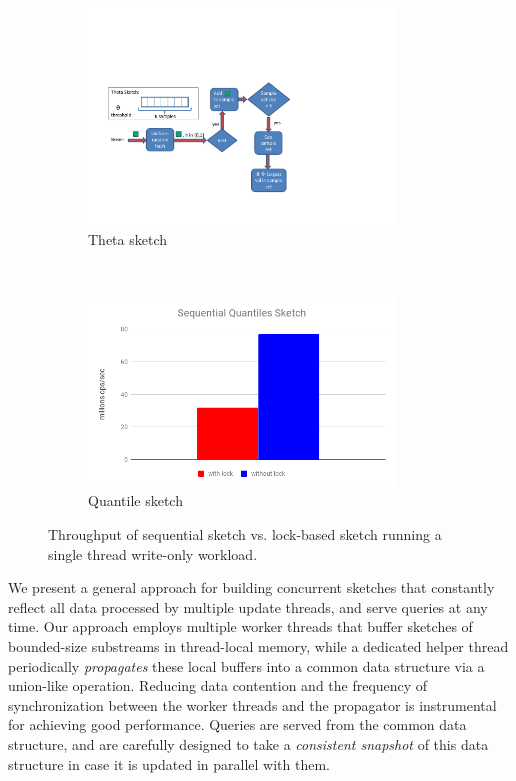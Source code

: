 \begin{figure}[t!]
    \centering
    \begin{subfigure}[t]{0.49\textwidth}
        \centering
        \includegraphics[width=3.2in]{images/seqTheta}
        \caption{Theta sketch}
        \label{fig:LockIsBadTheta}
    \end{subfigure}%
    ~ 
    \begin{subfigure}[t]{0.49\textwidth}
        \centering
        \includegraphics[width=3.2in]{images/seqQuantiles}
        \caption{Quantile sketch}
        \label{fig:LockIsBadQuantiles}
    \end{subfigure}
    \caption{Throughput of sequential sketch vs. lock-based sketch running a single thread write-only workload.}
    \label{fig:lockBased}
\end{figure}



We present a general approach for building concurrent sketches that
constantly reflect all data processed by multiple update threads, 
and serve queries at any time. %
Our  approach employs multiple worker threads that buffer sketches of bounded-size substreams in thread-local memory, while a dedicated helper thread 
periodically \emph{propagates} these local buffers into a common data structure via a union-like operation.
 Reducing data contention and the frequency of synchronization between the worker threads and the propagator is instrumental for achieving good performance. Queries are served from the common data structure, and are carefully 
 designed to take a \emph{consistent snapshot} of this data structure in case it is updated in parallel with them.

